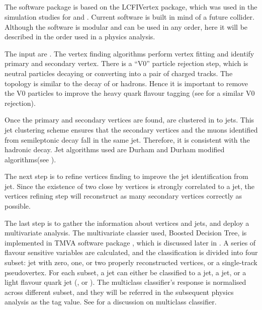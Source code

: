 \subsection{\lcfiplus}

The \lcfiplus software package is based on the LCFIVertex package, which was used in the simulation studies for \ILCloi \cite{Abe:2010aa,Aihara:2009ad} and \CLICcdr \cite{Linssen:2012hp}. Current software is built in mind of a future \ee collider. Although the software is modular and can be used in any order, here it will be described in the order used in a physics analysis.

The input are \PFOs. The vertex finding algorithms perform vertex fitting and identify primary and secondary vertex. There is a ``V0'' particle rejection step, which is neutral particles decaying or converting into a pair of charged tracks. The topology is similar to the decay of \Pbottom or \Pcharm hadrons. Hence it is important to remove the V0 particles to improve the heavy quark flavour tagging (see  for a similar V0 rejection).

Once the primary and secondary vertices are found, \PFOs are clustered in to jets. This jet clustering scheme ensures that the secondary vertices and the muons identified from semileptonic decay fall in the same jet. Therefore, it is consistent with the hadronic decay. Jet algorithms used are Durham and Durham modified algorithms(see \Section{}).

The next step is to refine vertices finding to improve the \Pbottom jet identification from \Pcharm jet. Since the existence of two close by vertices is strongly correlated to a \Pbottom jet, the vertices refining step will reconstruct as many secondary vertices correctly as possible.

The last step is to gather the information about vertices and jets, and deploy a multivariate analysis. The multivariate classier used, Boosted Decision Tree,  is implemented in TMVA software package \cite{Hocker:2007ht}, which is discussed later in \Section{}. A series of flavour sensitive variables are calculated, and the classification is divided into four subset: jet with zero, one, or two properly reconstructed vertices, or a single-track pseudovertex. For each subset, a jet can either be classified to a \Pbottom jet, a \Pcharm jet, or a light flavour quark jet (\Pup, \Pdown or \Pstrange). The multiclass classifier's response is normalised across different subset, and they will be referred in the subsequent physics analysis as the tag value. See \Section{} for a discussion on multiclass classifier.

